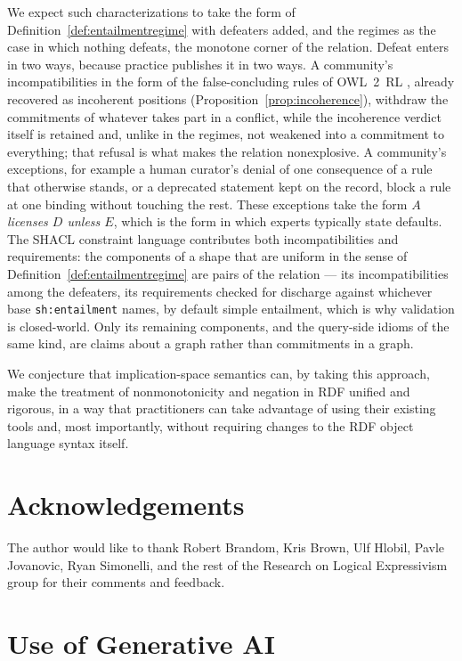 \documentclass[12pt]{article}
\theoremstyle{definition}
\begin{document}
We expect such characterizations to take the form of Definition~\ref{def:entailmentregime} with defeaters added, and the regimes as the case in which nothing defeats, the monotone corner of the relation. Defeat enters in two ways, because practice publishes it in two ways. A community's incompatibilities in the form of the false-concluding rules of OWL~2~RL \citep{motik2012owl}, already recovered as incoherent positions (Proposition~\ref{prop:incoherence}), withdraw the commitments of whatever takes part in a conflict, while the incoherence verdict itself is retained and, unlike in the regimes, not weakened into a commitment to everything; that refusal is what makes the relation nonexplosive. A community's exceptions, for example a human curator's denial of one consequence of a rule that otherwise stands, or a deprecated statement kept on the record, block a rule at one binding without touching the rest. These exceptions take the form \emph{$A$ licenses $D$ unless $E$}, which is the form in which experts typically state defaults. The SHACL constraint language \citep{knublauch2017shapes} contributes both incompatibilities and requirements: the components of a shape that are uniform in the sense of Definition~\ref{def:entailmentregime} are pairs of the relation --- its incompatibilities among the defeaters, its requirements checked for discharge against whichever base \texttt{sh:entailment} names, by default simple entailment, which is why validation is closed-world. Only its remaining components, and the query-side idioms of the same kind, are claims about a graph rather than commitments in a graph.

We conjecture that implication-space semantics can, by taking this approach, make the treatment of nonmonotonicity and negation in RDF unified and rigorous, in a way that practitioners can take advantage of using their existing tools and, most importantly, without requiring changes to the RDF object language syntax itself.

\section*{Acknowledgements}

The author would like to thank Robert Brandom, Kris Brown, Ulf Hlobil, Pavle Jovanovic, Ryan Simonelli, and the rest of the Research on Logical Expressivism group for their comments and feedback.

\section*{Use of Generative AI}
\end{document}
